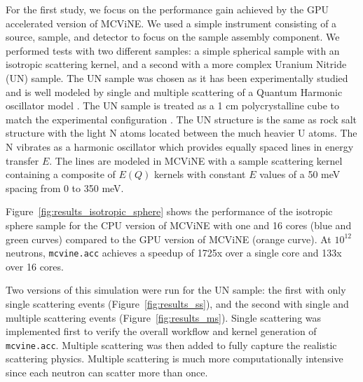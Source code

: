 For the first study, we focus on the performance gain achieved by the GPU accelerated version of MCViNE.
We used a simple instrument consisting of a source, sample, and detector to focus on the sample assembly component.
We performed tests with two different samples: a simple spherical sample with an isotropic scattering kernel, and a second with a more complex Uranium Nitride (UN) sample.
The UN sample was chosen as it has been experimentally studied and is well modeled by single and multiple scattering of a Quantum Harmonic oscillator model \cite{aczel2012quantum,lin2014UN}.
The UN sample is treated as a 1 cm polycrystalline cube to match the experimental configuration \cite{aczel2012quantum}.
The UN structure is the same as  rock salt structure with the light N atoms located between the much heavier U atoms.
The N vibrates as a harmonic oscillator which provides equally spaced lines in energy transfer $E$.
The lines are modeled in MCViNE with a sample scattering kernel containing a composite of $E(Q)$ kernels with constant $E$ values of a 50 meV spacing from 0 to 350 meV.

Figure~\ref{fig:results_isotropic_sphere} shows the performance of the isotropic sphere sample for the CPU version of MCViNE with one and 16 cores (blue and green curves) compared to the GPU version of MCViNE (orange curve). At $10^{12}$ neutrons, \texttt{mcvine.acc} achieves a speedup of 1725x over a single core and 133x over 16 cores.


Two versions of this simulation were run for the UN sample: the first with only single scattering events (Figure~\ref{fig:results_ss}), and the second with single and multiple scattering events (Figure~\ref{fig:results_ms}).
Single scattering was implemented first to verify the overall workflow and kernel generation of \texttt{mcvine.acc}. Multiple scattering was then added to fully capture the realistic scattering physics.
Multiple scattering is much more computationally intensive since each neutron can scatter more than once.

